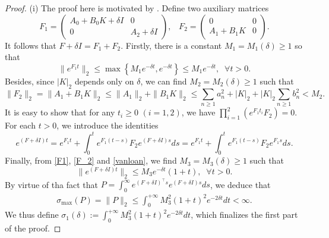 \documentclass[review]{elsarticle}
\numberwithin{equation}{section}
\begin{document}
\begin{proof}
  (i) The proof here is motivated by \cite{KF}. Define two auxiliary matrices
$$F_1=\left(\begin{array}{cc}
A_0+B_0 K+\delta I & 0 \\
0& A_2+\delta I
\end{array}\right),\;\;\;F_2=\left(\begin{array}{cc}
0 & 0 \\
A_1+B_1 K&0
\end{array}\right).$$ 
It follows that $F+\delta I=F_1+F_2$.
Firstly, there is a constant $M_1=M_1\left(\delta\right)\ge 1$ so that
\begin{equation}
\label{F1}
   \|e ^{F_1t}\|_2\le \max\left\{M_1e^{-\delta t},e^{-\delta t}\right\}\le M_1e^{-\delta t},\;\; \forall t>0.
   \end{equation}
Besides, since $|K|_2$ depends only on $\delta$, we can find $M_2=M_2\left(\delta\right)\ge 1$ such that
\begin{equation}
\label{F_2}
    \|F_2\|_2=\|A_1+B_1K\|_2\le \|A_1\|_2+\|B_1K\|_2\le \sum_{n\ge 1}a_n^2+|K|_2+ |K|_2\sum_{n\ge 1}b_n^2<M_2.
\end{equation}
 It is easy to show that for any $t_i\ge 0$ $(i=1,2)$, we have $\prod_{i=1}^2(e^{F_1t_i}F_2)=0$. For each $t>0$, we introduce the identities
\begin{equation}
    \label{vanloan}
    e^{(F+\delta I)t}=e^{F_1t}+\int_{0}^te^{F_1(t-s)}F_2e^{(F+\delta I)s}ds=e^{F_1t}+\int_{0}^te^{F_1(t-s)}F_2e^{F_1s}ds.
\end{equation}
Finally, from \eqref{F1}, \eqref{F_2} and \eqref{vanloan}, we find $M_3=M_3\left(\delta\right)\ge 1$ such that
\begin{equation*}
   \| e^{(F+\delta I)t}\|_2\le M_3e^{-\delta t}(1+t),\;\; \forall t>0.
\end{equation*}
By virtue of tha fact that $P=\int_0^{\infty}e^{(F+\delta I)^{\top}s}e^{(F+\delta I)s}ds$, we deduce that
    \begin{equation*}
    \begin{aligned}
        \sigma_{\max}(P)=\|P\|_2\le \int_0^{+\infty}M_3^2(1+t)^2e^{-2\delta t}dt<\infty.
         \end{aligned}
    \end{equation*}
  We thus define $\sigma_1\left(\delta\right):=\int_0^{+\infty}M_3^2(1+t)^2e^{-2\delta t}dt$, which finalizes the first part of the proof.


\end{proof}
\end{document}

